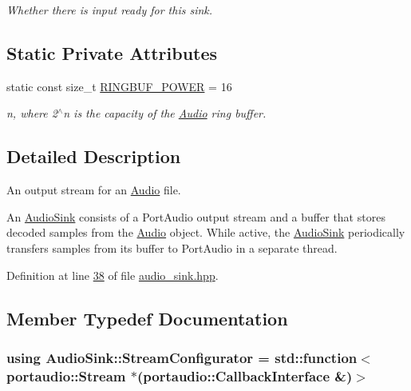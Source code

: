 \begin{DoxyCompactItemize}
\begin{DoxyCompactList}\small\item\em Whether there is input ready for this sink. \end{DoxyCompactList}\end{DoxyCompactItemize}
\subsection*{Static Private Attributes}
\begin{DoxyCompactItemize}
\item 
static const size\+\_\+t \hyperlink{classAudioSink_a152e5a388d4570211509a2a19a38c321}{R\+I\+N\+G\+B\+U\+F\+\_\+\+P\+O\+W\+E\+R} = 16
\begin{DoxyCompactList}\small\item\em n, where 2$^\wedge$n is the capacity of the \hyperlink{classAudio}{Audio} ring buffer. \end{DoxyCompactList}\end{DoxyCompactItemize}


\subsection{Detailed Description}
An output stream for an \hyperlink{classAudio}{Audio} file. 

An \hyperlink{classAudioSink}{Audio\+Sink} consists of a Port\+Audio output stream and a buffer that stores decoded samples from the \hyperlink{classAudio}{Audio} object. While active, the \hyperlink{classAudioSink}{Audio\+Sink} periodically transfers samples from its buffer to Port\+Audio in a separate thread. 

Definition at line \hyperlink{audio__sink_8hpp_source_l00038}{38} of file \hyperlink{audio__sink_8hpp_source}{audio\+\_\+sink.\+hpp}.



\subsection{Member Typedef Documentation}
\hypertarget{classAudioSink_ae5b8370aa17c24c6fc8f8e0c5778168c}{
\subsubsection[{Stream\+Configurator}]{\setlength{\rightskip}{0pt plus 5cm}using {\bf Audio\+Sink\+::\+Stream\+Configurator} =  std\+::function$<$ portaudio\+::\+Stream $\ast$(portaudio\+::\+Callback\+Interface \&)$>$}}\label{classAudioSink_ae5b8370aa17c24c6fc8f8e0c5778168c}


